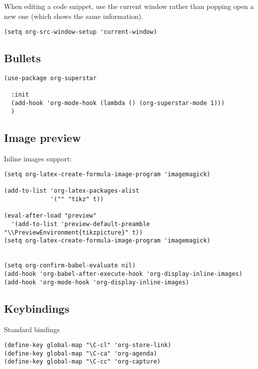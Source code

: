 \documentclass[12pt]{article}
\begin{document}
When editing a code snippet, use the current window rather than popping open a
new one (which shows the same information).
\begin{verbatim}
(setq org-src-window-setup 'current-window)
\end{verbatim}

\subsection{Bullets}
\label{sec:orgedc3fc1}

\begin{verbatim}
(use-package org-superstar

  :init 
  (add-hook 'org-mode-hook (lambda () (org-superstar-mode 1)))
  )

\end{verbatim}


\subsection{Image preview}
\label{sec:org59aaca7}

Inline images support:

\begin{verbatim}
(setq org-latex-create-formula-image-program 'imagemagick)

(add-to-list 'org-latex-packages-alist
             '("" "tikz" t))

(eval-after-load "preview"
  '(add-to-list 'preview-default-preamble "\\PreviewEnvironment{tikzpicture}" t))
(setq org-latex-create-formula-image-program 'imagemagick)


(setq org-confirm-babel-evaluate nil)
(add-hook 'org-babel-after-execute-hook 'org-display-inline-images)   
(add-hook 'org-mode-hook 'org-display-inline-images)
\end{verbatim}

\subsection{Keybindings}
\label{sec:orge3d61c6}


Standard bindings

\begin{verbatim}
(define-key global-map "\C-cl" 'org-store-link)
(define-key global-map "\C-ca" 'org-agenda)
(define-key global-map "\C-cc" 'org-capture)
\end{verbatim}
\end{document}
